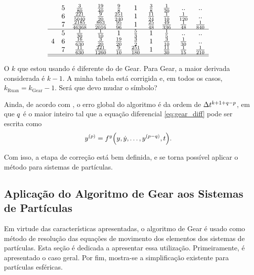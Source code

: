 \begin{table}[h]
\begin{equation*}
\begin{array}{cccccccccc}
		& 5 & \frac{3}{80} & \frac{19}{40} & \frac{9}{8} & 1 & \frac{3}{8} & \frac{1}{20} & \emptyTableEntry & \emptyTableEntry \\
		& 6 & \frac{221}{5040} & \frac{9}{20} & \frac{251}{240} & 1 & \frac{11}{24} & \frac{1}{10} & \frac{1}{120} & \emptyTableEntry \\
		& 7 & \frac{2185}{46368} & \frac{863}{2016} & \frac{95}{96} & 1 & \frac{25}{48} & \frac{49}{336} & \frac{1}{48} & \frac{1}{840} \\
	\hline
		\multirow{3}{*}{4} 
		& 5 & \frac{1}{30} & \frac{1}{10} & 1 & \frac{5}{3} & 1 & \frac{1}{5} & \emptyTableEntry & \emptyTableEntry \\
		& 6 & \frac{16}{630} & \frac{3}{20} & \frac{19}{20} & \frac{3}{2} & 1 & \frac{3}{10} & \frac{1}{30} & \emptyTableEntry \\
		& 7 & \frac{11}{630} & \frac{221}{1260} & \frac{9}{10} & \frac{251}{180} & 1 & \frac{11}{30} & \frac{1}{15} & \frac{1}{210} \\
	\hline
	\hline	
		\end{array}
	\end{equation*}
\end{table}

\alert{O \(k\) que estou usando é diferente do de Gear. Para Gear, a maior derivada considerada é \(k-1\). A minha tabela está corrigida e, em todos os casos, \(k_{\text{Ruan}} = k_{\text{Gear}}-1 \). Será que devo mudar o símbolo?}

Ainda, de acordo com , o erro global do algoritmo é da ordem de \(\Delta t^{k+1+q-p}\), em que \(q\) é o maior inteiro tal que a equação diferencial \eqref{eq:gear_diff} pode ser escrita como
\begin{equation} \label{eq:smaller_diff}
	\deriv{\eqOrder}{y} = \eqFor{y}\pqty{y, \deriv{1}{y},\dots,\deriv{\eqOrder-\maxDerivOrder}{y}, t}.
\end{equation}

Com isso, a etapa de correção está bem definida, e se torna possível aplicar o método para sistemas de partículas.

\subsection{Aplicação do Algoritmo de Gear aos Sistemas de Partículas} \label{subsec:gear_application}

Em virtude das características apresentadas, o algoritmo de Gear é usado como método de resolução das equações de movimento dos elementos dos sistemas de partículas. Esta seção é dedicada a apresentar essa utilização. Primeiramente, é apresentado o caso geral. Por fim, mostra-se a simplificação existente para partículas esféricas.

